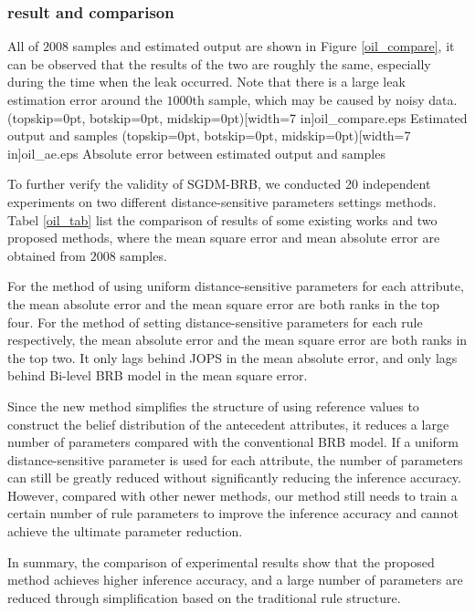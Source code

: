 \documentclass{ieeeaccess}
\begin{document}
\subsubsection{result and comparison}
All of $2008$ samples and estimated output are shown in Figure \ref{oil_compare}, it can be observed that the results of the two are roughly the same,
especially during the time when the leak occurred.
Note that there is a large leak estimation error around the $1000$th sample,
which may be caused by noisy data.
\Figure[!t](topskip=0pt, botskip=0pt, midskip=0pt)[width=7 in]{oil_compare.eps}
{Estimated output and samples\label{oil_compare}}
\Figure[!t](topskip=0pt, botskip=0pt, midskip=0pt)[width=7 in]{oil_ae.eps}
{Absolute error between estimated output and samples\label{oil_ae}}


To further verify the validity of SGDM-BRB, we conducted 20 independent experiments on two different distance-sensitive parameters settings methods.
Tabel \ref{oil_tab} list the comparison of results of some existing works and two proposed methods,
where the mean square error and mean absolute error are obtained from $2008$ samples.

For the method of using uniform distance-sensitive parameters for each attribute, the mean absolute error and the mean square error are both ranks in the top four.
For the method of setting distance-sensitive parameters for each rule respectively, the mean absolute error and the mean square error are both ranks in the top two.
It only lags behind JOPS in the mean absolute error, and only lags behind Bi-level BRB model in the mean square error.

Since the new method simplifies the structure of using reference values to construct the belief distribution of the antecedent attributes,
it reduces a large number of parameters compared with the conventional BRB model.
If a uniform distance-sensitive parameter is used for each attribute,
the number of parameters can still be greatly reduced without significantly reducing the inference accuracy.
However, compared with other newer methods, our method still needs to train a certain number of rule parameters to improve the inference accuracy and cannot achieve the ultimate parameter reduction.

In summary, the comparison of experimental results show that the proposed method  achieves higher inference accuracy,
and a large number of parameters are reduced through simplification based on the traditional rule structure.
\end{document}
